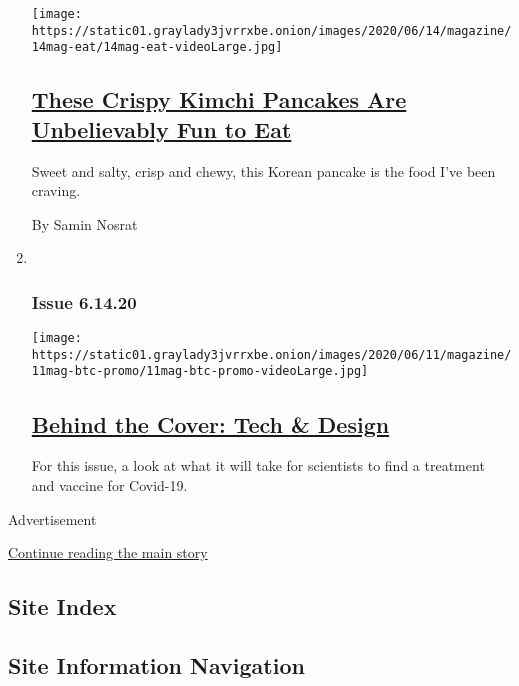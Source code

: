\begin{enumerate}
  \texttt{[image: https://static01.graylady3jvrrxbe.onion/images/2020/06/14/magazine/14mag-eat/14mag-eat-videoLarge.jpg]}

  \hypertarget{these-crispy-kimchi-pancakes-are-unbelievably-fun-to-eat}{%
  \subsection{\texorpdfstring{\href{/2020/06/10/magazine/bored-with-the-same-old-try-these-crispy-kimchi-pancakes.html}{These
  Crispy Kimchi Pancakes Are Unbelievably Fun to
  Eat}}{These Crispy Kimchi Pancakes Are Unbelievably Fun to Eat}}\label{these-crispy-kimchi-pancakes-are-unbelievably-fun-to-eat}}

  Sweet and salty, crisp and chewy, this Korean pancake is the food I've
  been craving.

  By Samin Nosrat
\item ~
  \hypertarget{issue-61420}{%
  \subsubsection{Issue 6.14.20}\label{issue-61420}}

  \texttt{[image: https://static01.graylady3jvrrxbe.onion/images/2020/06/11/magazine/11mag-btc-promo/11mag-btc-promo-videoLarge.jpg]}

  \hypertarget{behind-the-cover-tech--design}{%
  \subsection{\texorpdfstring{\href{/2020/06/12/magazine/behind-the-cover-tech-design.html}{Behind
  the Cover: Tech \&
  Design}}{Behind the Cover: Tech \& Design}}\label{behind-the-cover-tech--design}}

  For this issue, a look at what it will take for scientists to find a
  treatment and vaccine for Covid-19.
\end{enumerate}

Advertisement

\protect\hyperlink{after-mid1}{Continue reading the main story}

\hypertarget{site-index}{%
\subsection{Site Index}\label{site-index}}

\hypertarget{site-information-navigation}{%
\subsection{Site Information
Navigation}\label{site-information-navigation}}

